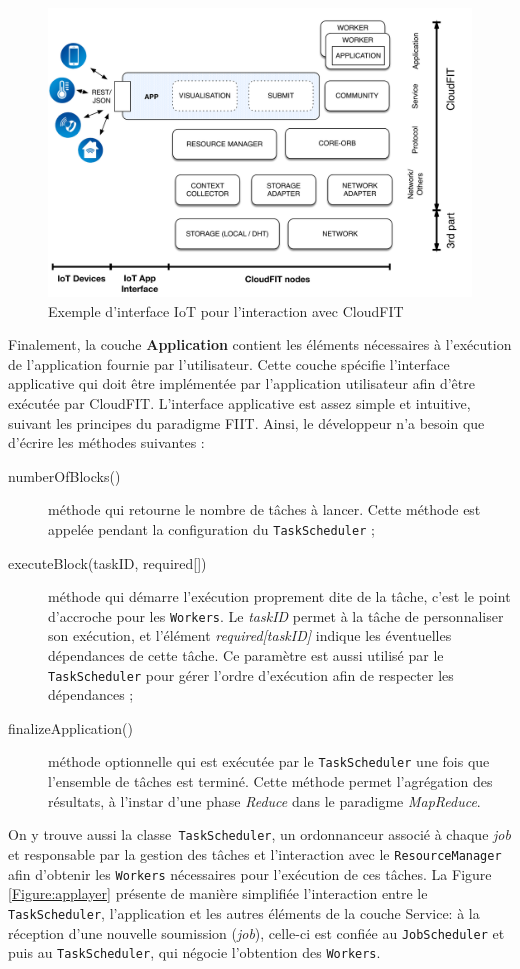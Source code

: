 \begin{figure}
	\centering
		\includegraphics[width=0.65\linewidth]{img/CloudFITstack-IoT}
		\caption{Exemple d'interface IoT pour l'interaction avec CloudFIT}\label{fig:cloudFitStackIoT}
\end{figure}


Finalement, la couche \textbf{Application} contient les éléments nécessaires à l'exécution de l'application fournie par l'utilisateur. Cette couche spécifie l'interface applicative qui doit être implémentée par l'application utilisateur afin d'être exécutée par CloudFIT. L'interface applicative est assez simple et intuitive, suivant les principes du paradigme FIIT. Ainsi, le développeur n'a besoin que d'écrire les méthodes suivantes :
\begin{description}
	\item [numberOfBlocks()] méthode qui retourne le nombre de tâches à lancer. Cette méthode est appelée pendant la configuration du \texttt{TaskScheduler} ;
	\item [executeBlock(taskID, required{[]}) ] méthode qui démarre l'exécution proprement dite de la tâche, c'est le point d'accroche pour les \texttt{Workers}. Le \textit{taskID} permet à la tâche de personnaliser son exécution, et l'élément \textit{required[taskID]} indique les éventuelles dépendances de cette tâche. Ce paramètre est aussi utilisé par le \texttt{TaskScheduler} pour gérer l'ordre d'exécution afin de respecter les dépendances ;
	\item [finalizeApplication()] méthode optionnelle qui est exécutée par le \texttt{TaskScheduler} une fois que l'ensemble de tâches est terminé. Cette méthode permet l'agrégation des résultats, à l'instar d'une phase \textit{Reduce} dans le paradigme \textit{MapReduce}.
\end{description}

On y trouve aussi la classe\texttt{ TaskScheduler}, un ordonnanceur associé à chaque \textit{job} et responsable par la gestion des tâches et l'interaction avec le \texttt{ResourceManager} afin d'obtenir les \texttt{Workers} nécessaires pour l'exécution de ces tâches. La Figure \ref{Figure:applayer} présente de manière simplifiée l'interaction entre le \texttt{TaskScheduler}, l'application et les autres éléments de la couche Service: à la réception d'une nouvelle soumission (\textit{job}), celle-ci est confiée au \texttt{JobScheduler} et puis au \texttt{TaskScheduler}, qui négocie l'obtention des \texttt{Workers}.   

